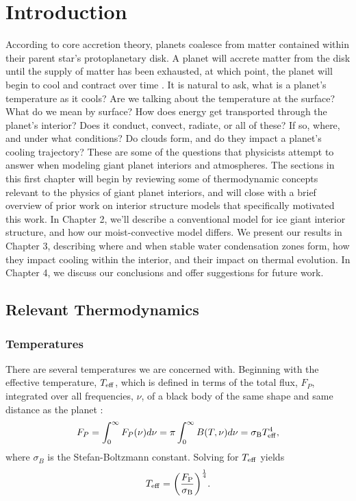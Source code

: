 \documentclass[11pt]{ucscthesisbs}
\begin{document}

\chapter{Introduction}
According to core accretion theory, planets coalesce from matter contained within their parent star's protoplanetary disk. A planet will accrete matter from the disk until the supply of matter has been exhausted, at which point, the planet will begin to cool and contract over time \citep{2007prpl.conf..591L,2013apf..book.....A}. It is natural to ask, what is a planet's temperature as it cools? Are we talking about the temperature at the surface? What do we mean by surface? How does energy get transported through the planet's interior? Does it conduct, convect, radiate, or all of these? If so, where, and under what conditions? Do clouds form, and do they impact a planet's cooling trajectory? These are some of the questions that physicists attempt to answer when modeling giant planet interiors and atmospheres. The sections in this first chapter will begin by reviewing some of thermodynamic concepts relevant to the physics of giant planet interiors, and will close with a brief overview of prior work on interior structure models that specifically motivated this work. In Chapter 2, we'll describe a conventional model for ice giant interior structure, and how our moist-convective model differs. We present our results in Chapter 3, describing where and when stable water condensation zones form, how they impact cooling within the interior, and their impact on thermal evolution. In Chapter 4, we discuss our conclusions and offer suggestions for future work.

\section{Relevant Thermodynamics}
\subsection{Temperatures}
There are several temperatures we are concerned with. Beginning with the effective temperature, $T_{\rm eff}$, which is defined in terms of the total flux, $F_{P}$, integrated over all frequencies, $\nu$, of a black body of the same shape and same distance as the planet \citep{2010eapp.book.....S}:
\begin{equation}
   F_{P} =  \int_{0}^{\infty} F_{P}(\nu)  d\nu = \pi \int_{0}^{\infty} B(T, \nu) d\nu = \sigma_{\rm B}T_{\rm eff}^{4},
  \label{eq:effective_temp_integral}
\end{equation}  
where $\sigma_{B}$ is the Stefan-Boltzmann constant. Solving for $T_{\rm eff}$ yields
\begin{equation}
    T_{\rm eff} = \bigg(\frac{F_{\rm P}}{\sigma_{\rm B}}\bigg)^{\frac{1}{4}}.
  \label{eq:effective_temp}
\end{equation}
\end{document}
